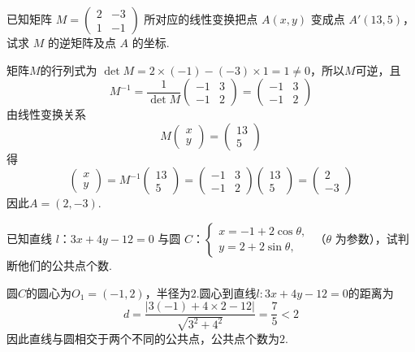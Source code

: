 \begin{problem}
已知矩阵 \( M = \begin{pmatrix} 2 & -3 \\ 1 & -1 \end{pmatrix} \) 所对应的线性变换把点 \( A(x, y) \) 变成点 \( A'(13, 5) \)，试求 \(M\) 的逆矩阵及点 \(A\) 的坐标.

\begin{solution}
矩阵\(M\)的行列式为
\(\det M=2\times(-1)-(-3)\times1=1\neq0\)，所以\(M\)可逆，且
\[
M^{-1}=\frac{1}{\det M}\begin{pmatrix}-1&3\\-1&2\end{pmatrix}
=\begin{pmatrix}-1&3\\-1&2\end{pmatrix}
\]
由线性变换关系
\[
M\begin{pmatrix}x\\y\end{pmatrix}=\begin{pmatrix}13\\5\end{pmatrix}
\]
得
\[
\begin{pmatrix}x\\y\end{pmatrix}=M^{-1}\begin{pmatrix}13\\5\end{pmatrix}
=\begin{pmatrix}-1&3\\-1&2\end{pmatrix}\begin{pmatrix}13\\5\end{pmatrix}
=\begin{pmatrix}2\\-3\end{pmatrix}
\]
因此\(A=(2,-3)\).
\end{solution}
\end{problem}

\begin{problem}
已知直线 \(l\)：\(3x + 4y - 12 = 0\) 与圆 \(C\)：\(\begin{cases}
x = -1 + 2\cos \theta,\\
y = 2 + 2\sin \theta,
\end{cases}\) （\(\theta\) 为参数），试判断他们的公共点个数.

\begin{solution}
圆\(C\)的圆心为\(O_1=(-1,2)\)，半径为\(2\).圆心到直线\(l:3x+4y-12=0\)的距离为
\[
d=\frac{|3(-1)+4\times2-12|}{\sqrt{3^2+4^2}}=\frac{7}{5}<2
\]
因此直线与圆相交于两个不同的公共点，公共点个数为\(2\).
\end{solution}
\end{problem}

